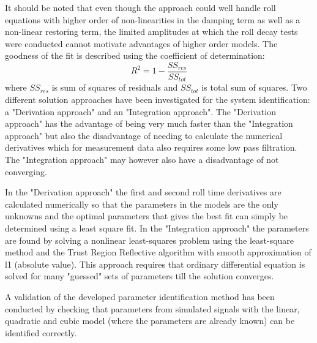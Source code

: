 It should be noted that even though the approach could well handle roll equations with higher order of non-linearities in the damping term as well as a non-linear restoring term, the limited amplitudes at which the roll decay tests were conducted cannot motivate advantages of higher order models. 
The goodness of the fit is described using the coefficient of determination:
\begin{equation} \label{eq:R2}
R^2=1-\frac{SS_{res}}{SS_{tot}}
\end{equation}
where $SS_{res}$ is sum of squares of residuals and $SS_{tot}$ is total sum of squares. Two different solution approaches have been investigated for the system identification: a "Derivation approach" and an "Integration approach". 
The "Derivation approach" has the advantage of being very much faster than the "Integration approach" but also the disadvantage of needing to calculate the numerical derivatives which for measurement data also requires some low pass filtration. The "Integration approach" may however also have a disadvantage of not converging.



In the "Derivation approach" the first and second roll time derivatives are calculated numerically so that the parameters in the models are the only unknowns and the optimal parameters that gives the best fit can simply be determined using a least square fit.
In the "Integration approach" the parameters are found by solving a nonlinear least-squares problem using the least-square method \parencite{noauthor_scipyoptimizeleast_squares_nodate} and the Trust Region Reflective algorithm with smooth approximation of l1 (absolute value). This approach requires that ordinary differential equation is solved for many "guessed" sets of parameters till the solution converges.

A validation of the developed parameter identification method has been conducted by checking that parameters from simulated signals with the linear, quadratic and cubic model  (where the parameters are already known) can be identified correctly. 

    


